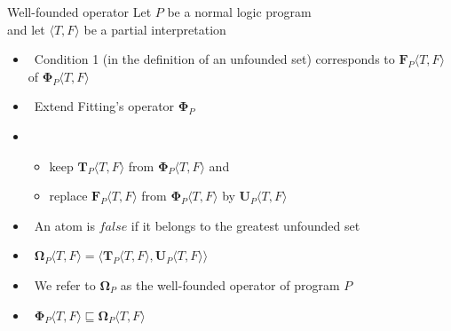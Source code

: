 \begin{frame}{Well-founded operator}
  Let $P$ be a normal logic program\\
  and let $\langle T,F \rangle$ be a partial interpretation
  \medskip
  \begin{itemize}
  \item<2->  \
    Condition 1 (in the definition of an unfounded set)
    corresponds to  ${\mathbf{F}}_P\langle T,F \rangle$
    of ${\mathbf{\Phi}}_P\langle T,F \rangle$
    \medskip
  \item<3->  \
    Extend Fitting's operator $\mathbf{\Phi}_P$
  \item<4-> []
    \begin{itemize}\normalsize
    \item keep    ${\mathbf{T}}_P\langle T,F \rangle$ from ${\mathbf{\Phi}}_P\langle T,F \rangle$ and
    \item replace ${\mathbf{F}}_P\langle T,F \rangle$ from ${\mathbf{\Phi}}_P\langle T,F \rangle$ by
      ${\mathbf{U}}_P\langle T,F \rangle$
    \end{itemize}
    \medskip
  \item<only@5 >  \ An atom is $\mathit{false}$ if it belongs to the greatest unfounded set
  \item<only@7->  \
    \(
    {\mathbf{\Omega}}_P\langle T,F \rangle
    =
    \langle {\mathbf{T}}_P\langle T,F \rangle, {\mathbf{U}}_P\langle T,F \rangle\rangle
    \)
    \smallskip
  \item<only@8 > \structure{Note} \ We refer to ${\mathbf{\Omega}}_P$ as the \alert{well-founded operator} of program $P$
  \item<only@9->  \
    \(
    {\mathbf{\Phi}}_P  \langle T,F \rangle
    \sqsubseteq
    {\mathbf{\Omega}}_P\langle T,F \rangle
    \)
  \end{itemize}
\end{frame}
